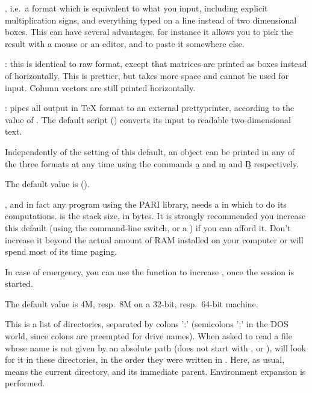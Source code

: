 \item {}, i.e.~a format which is equivalent to what you
input, including explicit multiplication signs, and everything typed on a
line instead of two dimensional boxes. This can have several advantages, for
instance it allows you to pick the result with a mouse or an editor, and to
paste it somewhere else.

\item {}: this is identical to raw format, except
that matrices are printed as boxes instead of horizontally. This is
prettier, but takes more space and cannot be used for input. Column vectors
are still printed horizontally.

\item {}: pipes all 
output in TeX format to an external prettyprinter, according to the value of
. The default script () converts its input
to readable two-dimensional text.

Independently of the setting of this default, an object can be printed
in any of the three formats at any time using the commands \b{a} and \b{m}
and \b{B} respectively.

The default value is  ().

\label{se:def,parisize}
, and in fact any program using the PARI
library, needs a  in which to do its computations. 
is the stack size, in bytes. It is strongly recommended you increase this
default (using the  command-line switch, or a ) if you can
afford it. Don't increase it beyond the actual amount of RAM installed on
your computer or  will spend most of its time paging.

In case of emergency, you can use the  function to
increase , once the session is started.

The default value is 4M, resp.~8M on a 32-bit, resp.~64-bit machine.

\label{se:def,path}
This is a list of directories, separated by colons ':'
(semicolons ';' in the DOS world, since colons are preempted for drive names).
When asked to read a file whose name is not given by an absolute path
(does not start with \kbd{/},  or ),  will look for
it in these directories, in the order they were written in . Here,
as usual,  means the current directory, and  its immediate
parent. Environment expansion is performed.

